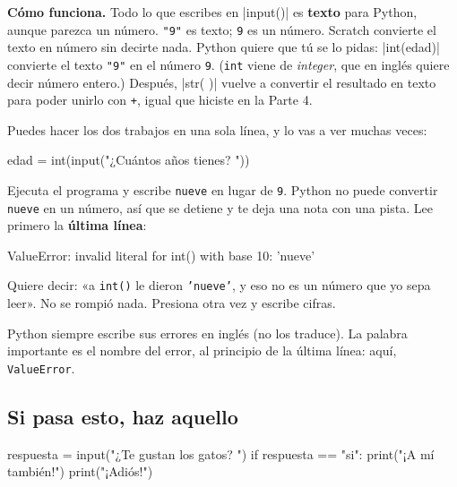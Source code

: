 \textbf{Cómo funciona.} Todo lo que escribes en \py|input()| es \textbf{texto} para Python, aunque parezca un número. \texttt{"9"} es texto; \texttt{9} es un número. Scratch convierte el texto en número sin decirte nada. Python quiere que tú se lo pidas: \py|int(edad)| convierte el texto \texttt{"9"} en el número \texttt{9}. (\texttt{int} viene de \emph{integer}, que en inglés quiere decir número entero.) Después, \py|str( )| vuelve a convertir el resultado en texto para poder unirlo con \texttt{+}, igual que hiciste en la Parte 4.

Puedes hacer los dos trabajos en una sola línea, y lo vas a ver muchas veces:
\begin{codenonum}
edad = int(input("¿Cuántos años tienes? "))
\end{codenonum}

\begin{watchout}
Ejecuta el programa y escribe \texttt{nueve} en lugar de \texttt{9}. Python no puede convertir \texttt{nueve} en un número, así que se detiene y te deja una nota con una pista. Lee primero la \textbf{última línea}:
\begin{errorbox}
ValueError: invalid literal for int() with base 10: 'nueve'
\end{errorbox}
Quiere decir: «a \texttt{int()} le dieron \texttt{'nueve'}, y eso no es un número que yo sepa leer». No se rompió nada. Presiona \playbtn{} otra vez y escribe cifras.

Python siempre escribe sus errores en inglés (no los traduce). La palabra importante es el nombre del error, al principio de la última línea: aquí, \texttt{ValueError}.
\end{watchout}

\subsection*{Si pasa esto, haz aquello}

\begin{tcbraster}[raster columns=2, raster equal height=rows, raster column skip=12pt, raster valign=center, raster force size=false, raster column 1/.style={width=0.36\linewidth}, raster column 2/.style={width=0.64\linewidth-12pt}]
\begin{tcolorbox}[colback=white, colframe=white, boxrule=0pt, valign=center, left=0pt, right=0pt]
\begin{scratch}[scale=0.63]
\end{scratch}
\end{tcolorbox}
\begin{code}
respuesta = input("¿Te gustan los gatos? ")
if respuesta == "si":
    print("¡A mí también!")
print("¡Adiós!")
\end{code}
\end{tcbraster}

